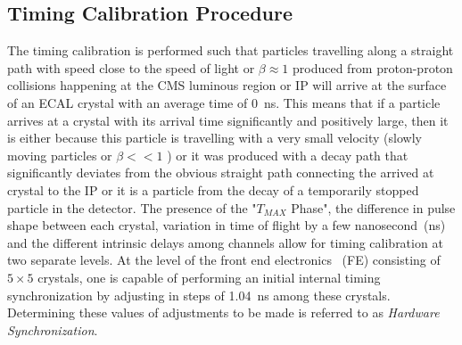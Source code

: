 \subsection{Timing Calibration Procedure}
The timing calibration is performed such that particles travelling along a straight path with speed close to the speed of light or $\beta \approx 1$ produced from proton-proton collisions happening at the CMS luminous region or IP will arrive at the surface of an ECAL crystal  with an average time of 0~ns. This means that if a particle arrives at a crystal with its arrival time significantly and positively large, then it is either because this particle is travelling with a very small velocity (slowly moving particles or  $\beta << 1$ ) or it was produced with a decay path that  significantly deviates from the obvious straight path connecting the arrived at crystal to the IP or it is a particle from the decay of a temporarily stopped particle in the detector.
The presence of the "$T_{MAX}$ Phase", the difference in pulse shape between each crystal, variation in time of flight by a few nanosecond~(ns) and the different intrinsic delays among channels allow for timing calibration at two separate levels.
At the level of the front end electronics ~(FE) consisting of $5\times5$ crystals, one is capable of performing an initial internal timing synchronization by adjusting in steps of 1.04~ns among these crystals. Determining these values of adjustments to be made is referred to as \textit{Hardware Synchronization}.

